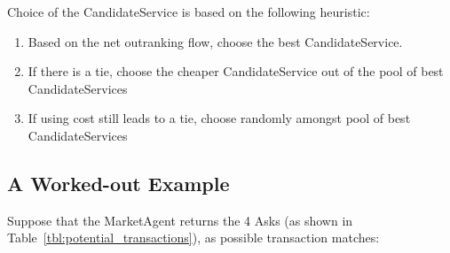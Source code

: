 \documentclass[10pt,journal,compsoc]{IEEEtran}
\begin{document}
Choice of the CandidateService is based on the following heuristic:
	\begin{enumerate}
		\item Based on the net outranking flow, choose the best CandidateService. 
		\item If there is a tie, choose the cheaper CandidateService out of the pool of best CandidateServices
		\item If using cost still leads to a tie, choose randomly amongst pool of best CandidateServices
	\end{enumerate}

\subsection{A Worked-out Example}
Suppose that the MarketAgent returns the 4 Asks (as shown in Table~\ref{tbl:potential_transactions}), as possible transaction matches:
\begin{table}
\centering
{}
\qquad
{}
\qquad 
{}
\qquad
{}
\caption{Asks returned by MarketAgent as potential transactions \label{tbl:potential_transactions}}
\end{table}
\end{document}
